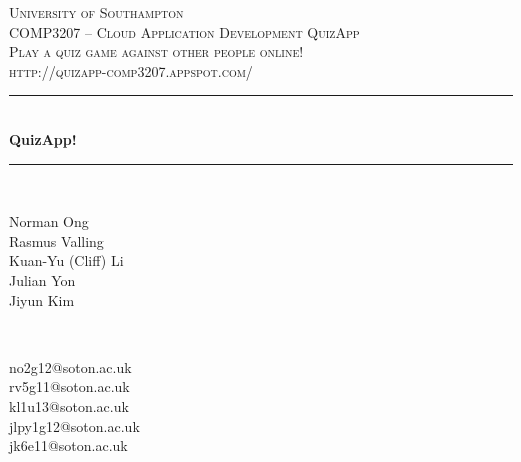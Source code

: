 \begin{titlepage}

\newcommand{\HRule}{\rule{\linewidth}{0.5mm}} %

\center %
 

\textsc{\LARGE University of Southampton}\\[1.5cm] %
\textsc{\Large COMP3207 – Cloud Application Development QuizApp}\\[0.5cm] %
\textsc{\large Play a quiz game against other people online! \\
http://quizapp-comp3207.appspot.com/}\\[0.5cm] %


\HRule \\[0.4cm]
{ \huge \bfseries QuizApp!}\\[0.4cm] %
\HRule \\[1.5cm]
 

\begin{minipage}{0.4\textwidth}
\begin{flushleft} \large
Norman Ong \\
Rasmus Valling\\
Kuan-Yu (Cliff) Li \\
Julian Yon\\
Jiyun Kim\\

\end{flushleft}
\end{minipage}
~
\begin{minipage}{0.4\textwidth}
\begin{flushright} \large
no2g12@soton.ac.uk\\
 rv5g11@soton.ac.uk\\
 kl1u13@soton.ac.uk\\
 jlpy1g12@soton.ac.uk\\
 jk6e11@soton.ac.uk\\
\end{flushright}
\end{minipage}\\[4cm]


\end{titlepage}
